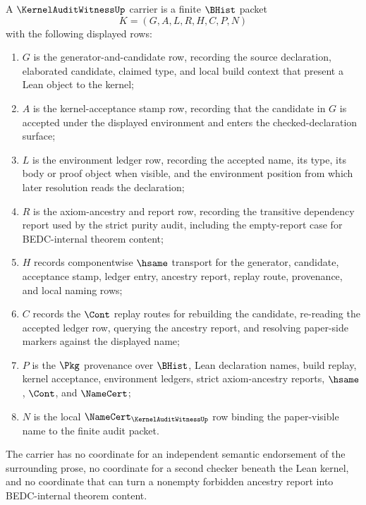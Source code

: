 \begin{definition}
\label{def:kernel-audit-witness-carrier}
A $\KernelAuditWitnessUp$ carrier is a finite $\BHist$ packet
$$
K=(G,A,L,R,H,C,P,N)
$$
with the following displayed rows:
\begin{enumerate}
\item $G$ is the generator-and-candidate row, recording the source declaration, elaborated candidate, claimed type, and local build context that present a Lean object to the kernel;
\item $A$ is the kernel-acceptance stamp row, recording that the candidate in $G$ is accepted under the displayed environment and enters the checked-declaration surface;
\item $L$ is the environment ledger row, recording the accepted name, its type, its body or proof object when visible, and the environment position from which later resolution reads the declaration;
\item $R$ is the axiom-ancestry and report row, recording the transitive dependency report used by the strict purity audit, including the empty-report case for BEDC-internal theorem content;
\item $H$ records componentwise $\hsame$ transport for the generator, candidate, acceptance stamp, ledger entry, ancestry report, replay route, provenance, and local naming rows;
\item $C$ records the $\Cont$ replay routes for rebuilding the candidate, re-reading the accepted ledger row, querying the ancestry report, and resolving paper-side markers against the displayed name;
\item $P$ is the $\Pkg$ provenance over $\BHist$, Lean declaration names, build replay, kernel acceptance, environment ledgers, strict axiom-ancestry reports, $\hsame$, $\Cont$, and $\NameCert$;
\item $N$ is the local $\NameCert_{\KernelAuditWitnessUp}$ row binding the paper-visible name to the finite audit packet.
\end{enumerate}
The carrier has no coordinate for an independent semantic endorsement of the surrounding prose, no coordinate for a second checker beneath the Lean kernel, and no coordinate that can turn a nonempty forbidden ancestry report into BEDC-internal theorem content.
\end{definition}

